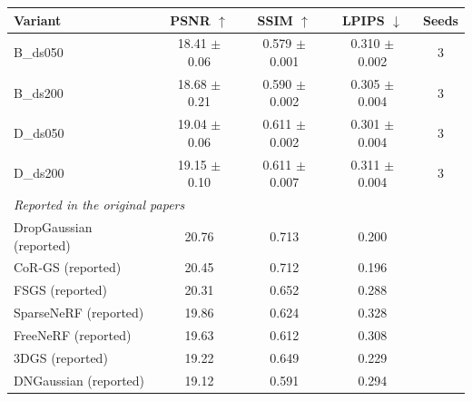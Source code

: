 \begin{tabular}{lcccc}
\toprule
Variant & PSNR $\uparrow$ & SSIM $\uparrow$ & LPIPS $\downarrow$ & Seeds \\
\midrule
B_ds050 & 18.41 $\pm$ 0.06 & 0.579 $\pm$ 0.001 & 0.310 $\pm$ 0.002 & 3 \\
B_ds200 & 18.68 $\pm$ 0.21 & 0.590 $\pm$ 0.002 & 0.305 $\pm$ 0.004 & 3 \\
D_ds050 & 19.04 $\pm$ 0.06 & 0.611 $\pm$ 0.002 & 0.301 $\pm$ 0.004 & 3 \\
D_ds200 & 19.15 $\pm$ 0.10 & 0.611 $\pm$ 0.007 & 0.311 $\pm$ 0.004 & 3 \\
\midrule
\multicolumn{5}{l}{\textit{Reported in the original papers}} \\
DropGaussian (reported) & 20.76 & 0.713 & 0.200 &  \\
CoR-GS (reported) & 20.45 & 0.712 & 0.196 &  \\
FSGS (reported) & 20.31 & 0.652 & 0.288 &  \\
SparseNeRF (reported) & 19.86 & 0.624 & 0.328 &  \\
FreeNeRF (reported) & 19.63 & 0.612 & 0.308 &  \\
3DGS (reported) & 19.22 & 0.649 & 0.229 &  \\
DNGaussian (reported) & 19.12 & 0.591 & 0.294 &  \\
\bottomrule
\end{tabular}
